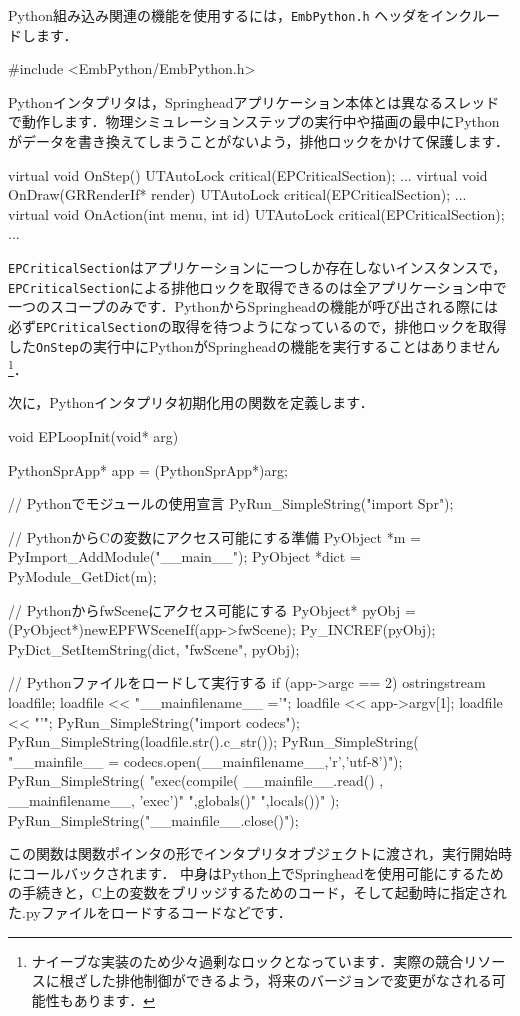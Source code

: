 Python組み込み関連の機能を使用するには，\texttt{EmbPython.h} ヘッダをインクルードします．
\begin{sourcecode}
#include <EmbPython/EmbPython.h>
\end{sourcecode}

Pythonインタプリタは，Springheadアプリケーション本体とは異なるスレッドで動作します．物理シミュレーションステップの実行中や描画の最中にPythonがデータを書き換えてしまうことがないよう，排他ロックをかけて保護します．
\begin{sourcecode}
virtual void OnStep(){
  UTAutoLock critical(EPCriticalSection);
  ...
}
virtual void OnDraw(GRRenderIf* render) {
  UTAutoLock critical(EPCriticalSection);
  ...
}
virtual void OnAction(int menu, int id){
  UTAutoLock critical(EPCriticalSection);
  ...
}
\end{sourcecode}
\texttt{EPCriticalSection}はアプリケーションに一つしか存在しないインスタンスで，\texttt{EPCriticalSection}による排他ロックを取得できるのは全アプリケーション中で一つのスコープのみです．PythonからSpringheadの機能が呼び出される際には必ず\texttt{EPCriticalSection}の取得を待つようになっているので，排他ロックを取得した\texttt{OnStep}の実行中にPythonがSpringheadの機能を実行することはありません\footnote{ナイーブな実装のため少々過剰なロックとなっています．実際の競合リソースに根ざした排他制御ができるよう，将来のバージョンで変更がなされる可能性もあります．}．

\KLUDGE 次に，Pythonインタプリタ初期化用の関数を定義します．
\begin{sourcecode}
void EPLoopInit(void* arg) {
  PythonSprApp* app = (PythonSprApp*)arg;

  // Pythonでモジュールの使用宣言
  PyRun_SimpleString("import Spr");
        
  // PythonからCの変数にアクセス可能にする準備
  PyObject *m = PyImport_AddModule("__main__");
  PyObject *dict = PyModule_GetDict(m);

  // PythonからfwSceneにアクセス可能にする
  PyObject* pyObj = (PyObject*)newEPFWSceneIf(app->fwScene);
  Py_INCREF(pyObj);
  PyDict_SetItemString(dict, "fwScene", pyObj);

  // Pythonファイルをロードして実行する
  if (app->argc == 2) {
    ostringstream loadfile;
    loadfile << "__mainfilename__ ='";
    loadfile << app->argv[1];
    loadfile << "'";
    PyRun_SimpleString("import codecs");
    PyRun_SimpleString(loadfile.str().c_str());
    PyRun_SimpleString(
\KLUDGE       "__mainfile__ = codecs.open(__mainfilename__,'r','utf-8')");
    PyRun_SimpleString(
\KLUDGE       "exec(compile( __mainfile__.read() , __mainfilename__, 'exec')"
\KLUDGE       ",globals()"
\KLUDGE       ",locals())" );
    PyRun_SimpleString("__mainfile__.close()");
  }
}
\end{sourcecode}
\KLUDGE この関数は関数ポインタの形でインタプリタオブジェクトに渡され，実行開始時にコールバックされます．
\KLUDGE 中身はPython上でSpringheadを使用可能にするための手続きと，C上の変数をブリッジするためのコード，そして起動時に指定された.pyファイルをロードするコードなどです．

